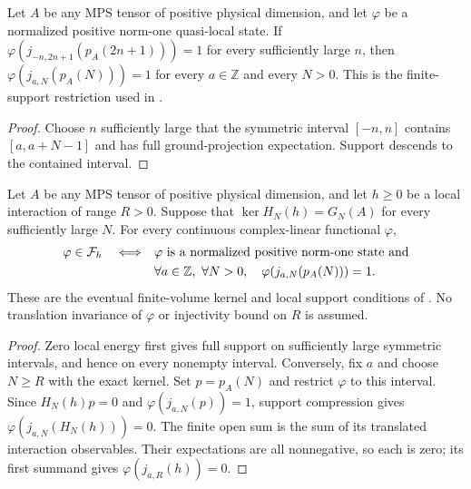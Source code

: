 \begin{lemma}
    \label{thm:eventual_symmetric_mps_support_all_intervals}
    \leanok
    Let $A$ be any MPS tensor of positive physical dimension, and let
    $\varphi$ be a normalized positive norm-one quasi-local state.
    If $\varphi(j_{-n,2n+1}(p_A(2n+1)))=1$ for every sufficiently large
    $n$, then $\varphi(j_{a,N}(p_A(N)))=1$ for every $a\in\mathbb Z$
    and every $N>0$. This is the finite-support restriction used in
    \cite[Theorem~1.1 and Section~3]{Nachtergaele1996Spectral}.
\end{lemma}
\begin{proof}\leanok
    Choose $n$ sufficiently large that the symmetric interval
    $[-n,n]$ contains $[a,a+N-1]$ and has full ground-projection
    expectation. Support descends to the contained interval.
\end{proof}

\begin{lemma}
    \label{thm:eventual_kernel_ground_state_support_iff}
    \leanok
    Let $A$ be any MPS tensor of positive physical dimension, and let
    $h\geq0$ be a local interaction of range $R>0$. Suppose that
    $\ker H_N(h)=G_N(A)$ for every sufficiently large $N$.
    For every continuous complex-linear functional $\varphi$,
    \begin{align}
        \varphi\in\mathcal F_h
        \quad\Longleftrightarrow\quad
         & \varphi\text{ is a normalized positive norm-one state and}\notag \\
         & \forall a\in\mathbb Z,\ \forall N>0,\quad
        \varphi(j_{a,N}(p_A(N)))=1.\notag
    \end{align}
    These are the eventual finite-volume kernel and local support
    conditions of \cite[Theorems~1.1--1.2 and Section~3]{Nachtergaele1996Spectral}.
    No translation invariance of $\varphi$ or injectivity bound on $R$
    is assumed.
\end{lemma}
\begin{proof}\leanok
    Zero local energy first gives full support on sufficiently large
    symmetric intervals, and hence on every nonempty interval.
    Conversely, fix $a$ and choose $N\geq R$ with the exact kernel.
    Set $p=p_A(N)$ and restrict $\varphi$ to this interval.
    Since $H_N(h)p=0$ and $\varphi(j_{a,N}(p))=1$, support compression
    gives $\varphi(j_{a,N}(H_N(h)))=0$. The finite open sum is the sum of
    its translated interaction observables. Their expectations are all
    nonnegative, so each is zero; its first summand gives
    $\varphi(j_{a,R}(h))=0$.
\end{proof}

